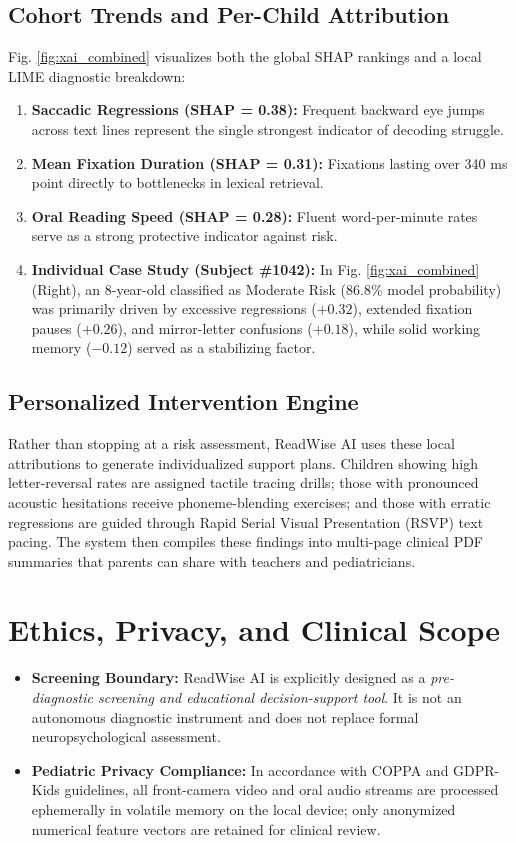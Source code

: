 \documentclass[conference]{IEEEtran}
\begin{document}
\subsection{Cohort Trends and Per-Child Attribution}
Fig. \ref{fig:xai_combined} visualizes both the global SHAP rankings and a local LIME diagnostic breakdown:
\begin{enumerate}
    \item \textbf{Saccadic Regressions (SHAP = 0.38):} Frequent backward eye jumps across text lines represent the single strongest indicator of decoding struggle.
    \item \textbf{Mean Fixation Duration (SHAP = 0.31):} Fixations lasting over 340 ms point directly to bottlenecks in lexical retrieval.
    \item \textbf{Oral Reading Speed (SHAP = 0.28):} Fluent word-per-minute rates serve as a strong protective indicator against risk.
    \item \textbf{Individual Case Study (Subject \#1042):} In Fig. \ref{fig:xai_combined}(Right), an 8-year-old classified as Moderate Risk (86.8\% model probability) was primarily driven by excessive regressions ($+0.32$), extended fixation pauses ($+0.26$), and mirror-letter confusions ($+0.18$), while solid working memory ($-0.12$) served as a stabilizing factor.
\end{enumerate}

\subsection{Personalized Intervention Engine}
Rather than stopping at a risk assessment, ReadWise AI uses these local attributions to generate individualized support plans. Children showing high letter-reversal rates are assigned tactile tracing drills; those with pronounced acoustic hesitations receive phoneme-blending exercises; and those with erratic regressions are guided through Rapid Serial Visual Presentation (RSVP) text pacing. The system then compiles these findings into multi-page clinical PDF summaries that parents can share with teachers and pediatricians.

\section{Ethics, Privacy, and Clinical Scope}
\begin{itemize}
    \item \textbf{Screening Boundary:} ReadWise AI is explicitly designed as a \textit{pre-diagnostic screening and educational decision-support tool}. It is not an autonomous diagnostic instrument and does not replace formal neuropsychological assessment.
    \item \textbf{Pediatric Privacy Compliance:} In accordance with COPPA and GDPR-Kids guidelines, all front-camera video and oral audio streams are processed ephemerally in volatile memory on the local device; only anonymized numerical feature vectors are retained for clinical review.
\end{itemize}
\end{document}
